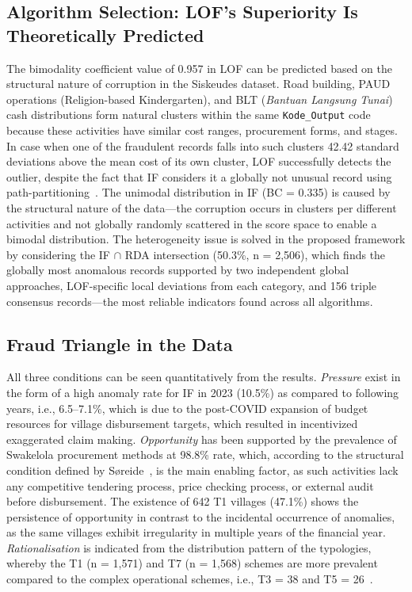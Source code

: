 \documentclass[3p,times,procedia]{elsarticle}
\begin{document}
\subsection{Algorithm Selection: LOF's Superiority Is Theoretically Predicted}

The bimodality coefficient value of 0.957 in LOF can be predicted based on the structural nature of corruption in the Siskeudes dataset. Road building, PAUD operations (Religion-based Kindergarten), and BLT (\textit{Bantuan Langsung Tunai}) cash distributions form natural clusters within the same \texttt{Kode\_Output} code because these activities have similar cost ranges, procurement forms, and stages. In case when one of the fraudulent records falls into such clusters 42.42 standard deviations above the mean cost of its own cluster, LOF successfully detects the outlier, despite the fact that IF considers it a globally not unusual record using path-partitioning~\cite{ref26}. The unimodal distribution in IF (BC = 0.335) is caused by the structural nature of the data—the corruption occurs in clusters per different activities and not globally randomly scattered in the score space to enable a bimodal distribution. The heterogeneity issue is solved in the proposed framework by considering the IF $\cap$ RDA intersection (50.3\%, n = 2,506), which finds the globally most anomalous records supported by two independent global approaches, LOF-specific local deviations from each category, and 156 triple consensus records—the most reliable indicators found across all algorithms.

\subsection{Fraud Triangle in the Data}

All three conditions can be seen quantitatively from the results. \textit{Pressure} exist in the form of a high anomaly rate for IF in 2023 (10.5\%) as compared to following years, i.e., 6.5–7.1\%, which is due to the post-COVID expansion of budget resources for village disbursement targets, which resulted in incentivized exaggerated claim making. \textit{Opportunity} has been supported by the prevalence of Swakelola procurement methods at 98.8\% rate, which, according to the structural condition defined by Søreide~\cite{ref22}, is the main enabling factor, as such activities lack any competitive tendering process, price checking process, or external audit before disbursement. The existence of 642 T1 villages (47.1\%) shows the persistence of opportunity in contrast to the incidental occurrence of anomalies, as the same villages exhibit irregularity in multiple years of the financial year. \textit{Rationalisation} is indicated from the distribution pattern of the typologies, whereby the T1 (n = 1,571) and T7 (n = 1,568) schemes are more prevalent compared to the complex operational schemes, i.e., T3 = 38 and T5 = 26~\cite{ref21}.
\end{document}
